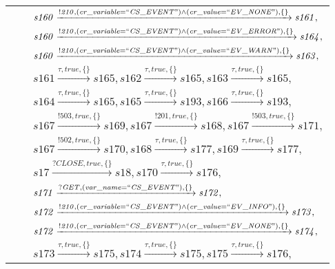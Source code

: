 \begin{tabular}{lcl}
\end{tabular}

\begin{tabular}{lcl}
& & $\mathit{s160}\xrightarrow{\mathit{!210}, \mathit{(cr\_variable = ``CS\_EVENT") \land (cr\_value = ``EV\_NONE")}, \{\}}\mathit{s161},$ \\
& & $\mathit{s160}\xrightarrow{\mathit{!210}, \mathit{(cr\_variable = ``CS\_EVENT") \land (cr\_value = ``EV\_ERROR")}, \{\}}\mathit{s164},$ \\
& & $\mathit{s160}\xrightarrow{\mathit{!210}, \mathit{(cr\_variable = ``CS\_EVENT") \land (cr\_value = ``EV\_WARN")}, \{\}}\mathit{s163},$ \\
& & $\mathit{s161}\xrightarrow{\mathit{\tau}, \mathit{true}, \{\}}\mathit{s165},\mathit{s162}\xrightarrow{\mathit{\tau}, \mathit{true}, \{\}}\mathit{s165},\mathit{s163}\xrightarrow{\mathit{\tau}, \mathit{true}, \{\}}\mathit{s165},$ \\
& & $\mathit{s164}\xrightarrow{\mathit{\tau}, \mathit{true}, \{\}}\mathit{s165},\mathit{s165}\xrightarrow{\mathit{\tau}, \mathit{true}, \{\}}\mathit{s193},\mathit{s166}\xrightarrow{\mathit{\tau}, \mathit{true}, \{\}}\mathit{s193},$ \\
& & $\mathit{s167}\xrightarrow{\mathit{!503}, \mathit{true}, \{\}}\mathit{s169},\mathit{s167}\xrightarrow{\mathit{!201}, \mathit{true}, \{\}}\mathit{s168},\mathit{s167}\xrightarrow{\mathit{!503}, \mathit{true}, \{\}}\mathit{s171},$ \\
& & $\mathit{s167}\xrightarrow{\mathit{!502}, \mathit{true}, \{\}}\mathit{s170},\mathit{s168}\xrightarrow{\mathit{\tau}, \mathit{true}, \{\}}\mathit{s177},\mathit{s169}\xrightarrow{\mathit{\tau}, \mathit{true}, \{\}}\mathit{s177},$ \\
& & $\mathit{s17}\xrightarrow{\mathit{?CLOSE}, \mathit{true}, \{\}}\mathit{s18},\mathit{s170}\xrightarrow{\mathit{\tau}, \mathit{true}, \{\}}\mathit{s176},$ \\
& & $\mathit{s171}\xrightarrow{\mathit{?GET}, \mathit{(var\_name = ``CS\_EVENT")}, \{\}}\mathit{s172},$ \\
& & $\mathit{s172}\xrightarrow{\mathit{!210}, \mathit{(cr\_variable = ``CS\_EVENT") \land (cr\_value = ``EV\_INFO")}, \{\}}\mathit{s173},$ \\
& & $\mathit{s172}\xrightarrow{\mathit{!210}, \mathit{(cr\_variable = ``CS\_EVENT") \land (cr\_value = ``EV\_NONE")}, \{\}}\mathit{s174},$ \\
& & $\mathit{s173}\xrightarrow{\mathit{\tau}, \mathit{true}, \{\}}\mathit{s175},\mathit{s174}\xrightarrow{\mathit{\tau}, \mathit{true}, \{\}}\mathit{s175},\mathit{s175}\xrightarrow{\mathit{\tau}, \mathit{true}, \{\}}\mathit{s176},$ \\

\end{tabular}
